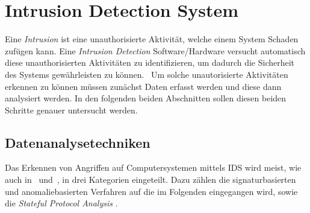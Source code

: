 

    \section{Intrusion Detection System}
    \label{sec:IDS}
        Eine \textit{Intrusion}  ist eine unauthorisierte Aktivität, welche einem System Schaden zufügen kann.
        Eine \textit{Intrusion Detection} Software/Hardware versucht automatisch diese 
        unauthorisierten Aktivitäten zu identifizieren, um dadurch die Sicherheit des Systems gewährleisten zu können.~\cite{IDSreview}
        Um solche unautorisierte Aktivitäten erkennen zu können müssen zunächst Daten erfasst werden und diese dann analysiert werden.
        In den folgenden beiden Abschnitten sollen diesen beiden Schritte genauer untersucht werden.

        \subsection{Datenanalysetechniken}
        \label{sec:Datenanalyse}
            Das Erkennen von Angriffen auf Computersystemen mittels IDS wird meist, wie auch in~\cite{IDSreview} und~\cite{IDSsurvey}, in drei Kategorien eingeteilt.
            Dazu zählen die signaturbasierten und anomaliebasierten Verfahren auf die im Folgenden eingegangen wird,
            sowie die \textit{Stateful Protocol Analysis} .
